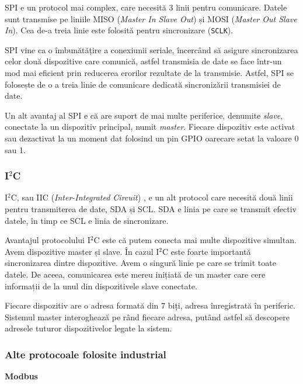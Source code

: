 SPI e un protocol mai complex, care necesită 3 linii pentru comunicare. Datele
sunt transmise pe liniile MISO (\textit{Master In
Slave Out}) și MOSI  (\textit{Master Out Slave In}). Cea
de-a treia linie este folosită pentru sincronizare (\texttt{SCLK}).

SPI vine ca o îmbunătățire a conexiunii seriale, încercând să asigure
sincronizarea celor două dispozitive care comunică, astfel transmisia de date
se face într-un mod mai eficient prin reducerea erorilor rezultate de la
transmisie. Astfel, SPI se folosește de o a treia linie de comunicare dedicată
sincronizării transmisiei de date.

Un alt avantaj al SPI e că are suport de mai multe periferice, denumite \textit{slave},
conectate la un dispozitiv principal, numit \textit{master}. Fiecare dispozitiv este
activat sau dezactivat la un moment dat folosind un pin GPIO oarecare setat la
valoare 0 sau 1.

\subsubsection{I$^2$C}
\label{sec:embed:bus:wired:i2c}

I$^2$C, sau IIC (\textit{Inter-Integrated Circuit}) , e un
alt protocol care necesită două linii pentru transmiterea de date, SDA și SCL.
SDA e linia pe care se transmit efectiv datele, în timp ce SCL e linia de
sincronizare.

Avantajul protocolului I$^2$C este că putem conecta mai multe dispozitive simultan.
Avem dispozitive master și slave. În cazul I$^2$C este foarte importantă
sincronizarea dintre dispozitive. Avem o singură linie pe care se trimit toate
datele. De aceea, comunicarea este mereu inițiată de un master care cere
informații de la unul din dispozitivele slave conectate.

Fiecare dispozitiv are o adresa formată din 7 biți, adresa înregistrată în
periferic. Sistemul master interoghează pe rând fiecare adresa, putând astfel să
descopere adresele tuturor dispozitivelor legate la sistem.

\subsubsection{Alte protocoale folosite industrial}
\label{sec:embed:bus:wired:other}

\textbf{Modbus}

